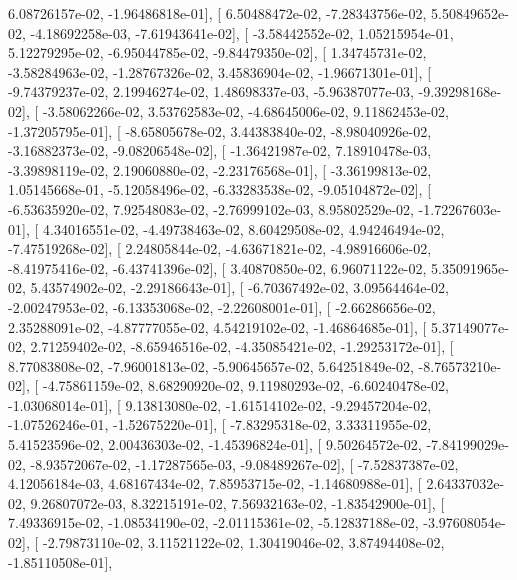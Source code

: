 \documentclass{article}
\begin{document}
          6.08726157e-02,  -1.96486818e-01],
       [  6.50488472e-02,  -7.28343756e-02,   5.50849652e-02,
         -4.18692258e-03,  -7.61943641e-02],
       [ -3.58442552e-02,   1.05215954e-01,   5.12279295e-02,
         -6.95044785e-02,  -9.84479350e-02],
       [  1.34745731e-02,  -3.58284963e-02,  -1.28767326e-02,
          3.45836904e-02,  -1.96671301e-01],
       [ -9.74379237e-02,   2.19946274e-02,   1.48698337e-03,
         -5.96387077e-03,  -9.39298168e-02],
       [ -3.58062266e-02,   3.53762583e-02,  -4.68645006e-02,
          9.11862453e-02,  -1.37205795e-01],
       [ -8.65805678e-02,   3.44383840e-02,  -8.98040926e-02,
         -3.16882373e-02,  -9.08206548e-02],
       [ -1.36421987e-02,   7.18910478e-03,  -3.39898119e-02,
          2.19060880e-02,  -2.23176568e-01],
       [ -3.36199813e-02,   1.05145668e-01,  -5.12058496e-02,
         -6.33283538e-02,  -9.05104872e-02],
       [ -6.53635920e-02,   7.92548083e-02,  -2.76999102e-03,
          8.95802529e-02,  -1.72267603e-01],
       [  4.34016551e-02,  -4.49738463e-02,   8.60429508e-02,
          4.94246494e-02,  -7.47519268e-02],
       [  2.24805844e-02,  -4.63671821e-02,  -4.98916606e-02,
         -8.41975416e-02,  -6.43741396e-02],
       [  3.40870850e-02,   6.96071122e-02,   5.35091965e-02,
          5.43574902e-02,  -2.29186643e-01],
       [ -6.70367492e-02,   3.09564464e-02,  -2.00247953e-02,
         -6.13353068e-02,  -2.22608001e-01],
       [ -2.66286656e-02,   2.35288091e-02,  -4.87777055e-02,
          4.54219102e-02,  -1.46864685e-01],
       [  5.37149077e-02,   2.71259402e-02,  -8.65946516e-02,
         -4.35085421e-02,  -1.29253172e-01],
       [  8.77083808e-02,  -7.96001813e-02,  -5.90645657e-02,
          5.64251849e-02,  -8.76573210e-02],
       [ -4.75861159e-02,   8.68290920e-02,   9.11980293e-02,
         -6.60240478e-02,  -1.03068014e-01],
       [  9.13813080e-02,  -1.61514102e-02,  -9.29457204e-02,
         -1.07526246e-01,  -1.52675220e-01],
       [ -7.83295318e-02,   3.33311955e-02,   5.41523596e-02,
          2.00436303e-02,  -1.45396824e-01],
       [  9.50264572e-02,  -7.84199029e-02,  -8.93572067e-02,
         -1.17287565e-03,  -9.08489267e-02],
       [ -7.52837387e-02,   4.12056184e-03,   4.68167434e-02,
          7.85953715e-02,  -1.14680988e-01],
       [  2.64337032e-02,   9.26807072e-03,   8.32215191e-02,
          7.56932163e-02,  -1.83542900e-01],
       [  7.49336915e-02,  -1.08534190e-02,  -2.01115361e-02,
         -5.12837188e-02,  -3.97608054e-02],
       [ -2.79873110e-02,   3.11521122e-02,   1.30419046e-02,
          3.87494408e-02,  -1.85110508e-01],
\end{document}
